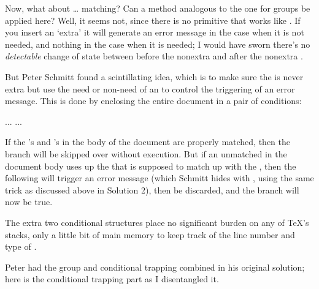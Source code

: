 Now, what about  \ldots {} matching? Can a method analogous to 
the one
for groups be applied here? Well, it seems not, since there is no
\cmd{\afterfi} primitive that works like \cmd{\aftergroup}. If you insert an
`extra'  it will generate an error message in the case when it is
not needed, and nothing in the case when it is needed; I would have
sworn there's no \emph{detectable} change of state between before the
nonextra  and after the nonextra .

But Peter Schmitt found a scintillating idea, 
which is to make sure
the  is never extra but use the need or non-need of an  to
control the triggering of an error message. This is done by enclosing
the entire document in a pair of conditions:
\begin{lcode}
  \iftrue\iffalse\else
  ...
  \fi...\else<error>\fi
\end{lcode}
If the 's and 's in the body of the document are properly
matched, then the  branch will be skipped over without
execution. But if an unmatched  in the document body uses
up the  that is supposed to match up with the , then
the following  will trigger an error message (which Schmitt hides
with \cmd{\batchmode}, using the same trick as discussed above in Solution
2), then be discarded, and the  branch will now be true.

The extra two conditional structures place no significant burden on
any of TeX's stacks, only a little bit of main memory to keep track of
the line number and type of .

Peter had the group and conditional trapping combined in his original
solution; here is the conditional trapping part as I disentangled it.

